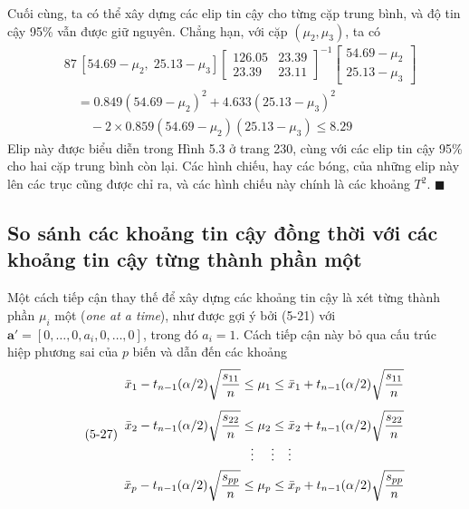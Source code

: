Cuối cùng, ta có thể xây dựng các elip tin cậy cho từng cặp trung bình, và độ tin cậy 95\% vẫn được giữ nguyên. Chẳng hạn, với cặp $(\mu_2,\mu_3)$, ta có
\begin{align*}
  &87\,[54.69-\mu_2,\;25.13-\mu_3]
  \begin{bmatrix}126.05&23.39\\23.39&23.11\end{bmatrix}^{-1}
  \begin{bmatrix}54.69-\mu_2\\25.13-\mu_3\end{bmatrix}\\
  &\quad=0.849(54.69-\mu_2)^2+4.633(25.13-\mu_3)^2\\
  &\qquad-2\times0.859(54.69-\mu_2)(25.13-\mu_3)\le 8.29
\end{align*}
Elip này được biểu diễn trong Hình 5.3 ở trang 230, cùng với các elip tin cậy 95\% cho hai cặp trung bình còn lại. Các hình chiếu, hay các bóng, của những elip này lên các trục cũng được chỉ ra, và các hình chiếu này chính là các khoảng $T^2$. \hfill$\blacksquare$
 
 
 
\subsection*{So sánh các khoảng tin cậy đồng thời với các khoảng tin cậy từng thành phần một}
 
Một cách tiếp cận thay thế để xây dựng các khoảng tin cậy là xét từng thành phần $\mu_i$ một (\emph{one at a time}), như được gợi ý bởi (5-21) với $\mathbf{a}'=[0,\dots,0,a_i,0,\dots,0]$, trong đó $a_i=1$. Cách tiếp cận này bỏ qua cấu trúc hiệp phương sai của $p$ biến và dẫn đến các khoảng
{\footnotesize\begin{equation}\tag{5-27}
\begin{array}{r@{\;}c@{\;}l}
  \bar{x}_1-t_{n-1}(\alpha/2)\sqrt{\dfrac{s_{11}}{n}} \le & \mu_1 \le & \bar{x}_1+t_{n-1}(\alpha/2)\sqrt{\dfrac{s_{11}}{n}}\\[14pt]
  \bar{x}_2-t_{n-1}(\alpha/2)\sqrt{\dfrac{s_{22}}{n}} \le & \mu_2 \le & \bar{x}_2+t_{n-1}(\alpha/2)\sqrt{\dfrac{s_{22}}{n}}\\[4pt]
  \vdots & \multicolumn{1}{c}{\vdots} & \vdots\\[4pt]
  \bar{x}_p-t_{n-1}(\alpha/2)\sqrt{\dfrac{s_{pp}}{n}} \le & \mu_p \le & \bar{x}_p+t_{n-1}(\alpha/2)\sqrt{\dfrac{s_{pp}}{n}}
\end{array}
\end{equation}}
 

